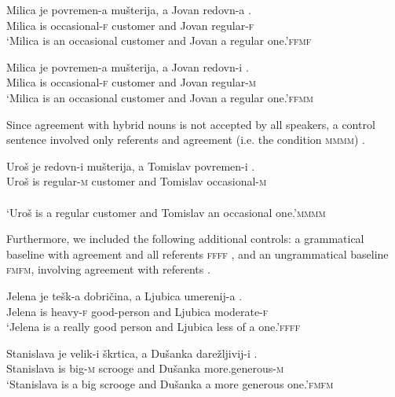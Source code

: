 \documentclass[output=paper,modfonts,newtxmath,hidelinks]{langscibook}
\begin{document}
  		\ea \gll Milica je povremen{-a} mušterija, a Jovan redovn{-a} \underline{\hspace{1.5cm}}.\\
  		Milica is occasional{-\textsc{f}} customer and Jovan regular{-\textsc{f}}\\
  		\glt `Milica is an occasional customer and Jovan a regular one.'\hfill  \textsc{ffmf}\label{14:ex12}
        \z
  		
  		\ea \gll Milica je povremen{-a} mušterija, a Jovan redovn{-i} \underline{\hspace{1.5cm}}.\\
  		Milica is occasional{-\textsc{f}} customer and Jovan regular{-\textsc{m}}\\
  		\glt `Milica is an occasional customer and Jovan a regular one.'\hfill \textsc{ffmm}\label{14:ex13}
        \z
  		
\noindent Since  agreement with hybrid nouns is not accepted by all speakers, a control sentence involved only  referents and agreement (i.e. the condition \textsc{mmmm}) .

		\ea \gll Uroš je redovn{-i} mušterija, a Tomislav povremen{-i} \underline{\hspace{1.5cm}}.\\
  			Uroš is regular{-\textsc{m}} customer and Tomislav occasional{-\textsc{m}}\\ \\
  			\glt `Uroš is a regular customer and Tomislav an occasional one.'\hfill \textsc{mmmm}\label{14:ex14}
            \z
     

\noindent Furthermore, we included the following additional controls: a grammatical baseline with  agreement and all  referents \textsc{ffff} , and an ungrammatical baseline \textsc{fmfm}, involving  agreement with  referents . 

  			\ea \gll Jelena je tešk{-a} dobričina, a Ljubica umerenij{-a} \underline{\hspace{1.5cm}}.\\
  			Jelena is heavy{-\textsc{f}} good-person and Ljubica moderate{-\textsc{f}}\\
  			\glt `Jelena is a really good person and Ljubica less of a one.'\hfill  \textsc{ffff}\label{14:ex15}
            \z
			
  			\ea \gll Stanislava je velik{-i} škrtica, a Dušanka darežljivij{-i} \underline{\hspace{1.5cm}}.\\
  			Stanislava is big{-\textsc{m}} scrooge and Dušanka more.generous{-\textsc{m}}\\
  			\glt `Stanislava is a big scrooge and Dušanka a more generous one.'\hfill  \textsc{fmfm}\label{14:ex16}
            \z
\end{document}
